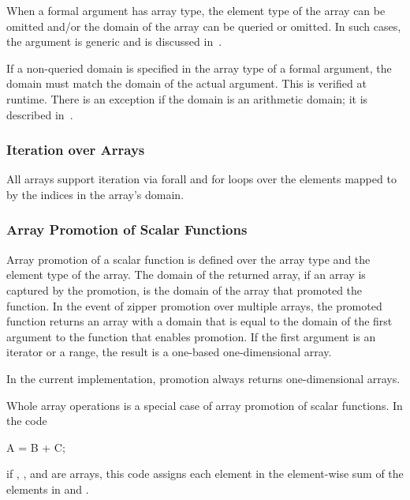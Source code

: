 When a formal argument has array type, the element type of the array
can be omitted and/or the domain of the array can be queried or
omitted.  In such cases, the argument is generic and is discussed
in~.

If a non-queried domain is specified in the array type of a formal
argument, the domain must match the domain of the actual argument.
This is verified at runtime.  There is an exception if the domain is
an arithmetic domain; it is described
in~.

\subsubsection{Iteration over Arrays}
\label{Iteration_over_Arrays}

All arrays support iteration via forall and for loops over the
elements mapped to by the indices in the array's domain.

\subsubsection{Array Promotion of Scalar Functions}
\label{Array_Promotion_of_Scalar_Functions}

Array promotion of a scalar function is defined over the array type
and the element type of the array.  The domain of the returned array,
if an array is captured by the promotion, is the domain of the array
that promoted the function.  In the event of zipper promotion over
multiple arrays, the promoted function returns an array with a domain
that is equal to the domain of the first argument to the function that
enables promotion.  If the first argument is an iterator or a range,
the result is a one-based one-dimensional array.

\begin{status}
In the current implementation, promotion always returns
one-dimensional arrays.
\end{status}

\begin{example}
Whole array operations is a special case of array promotion of scalar
functions.  In the code
\begin{chapel}
A = B + C;
\end{chapel}
if , , and  are arrays, this code assigns each
element in  the element-wise sum of the elements in 
and .
\end{example}

